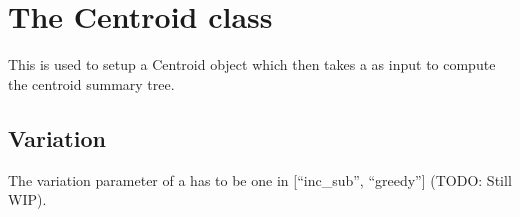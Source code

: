\documentclass[letterpaper,10pt,english]{sphinxmanual}
\begin{document}
\section{The Centroid class}
\label{\detokenize{summary:the-centroid-class}}
\begin{sphinxVerbatim}[commandchars=\\\{\}]
     
              
\end{sphinxVerbatim}

\sphinxAtStartPar
This is used to setup a Centroid object which then takes a  as input to compute the centroid summary tree.


\subsection{Variation}
\label{\detokenize{summary:variation}}
\sphinxAtStartPar
The variation parameter of a  has to be one in {[}“inc\_sub”, “greedy”{]} (TODO: Still WIP).
\end{document}
